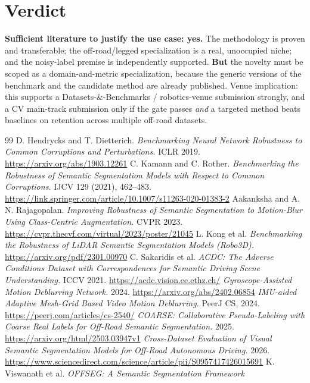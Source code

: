 \documentclass[11pt]{article}
\begin{document}
\section{Verdict}
\textbf{Sufficient literature to justify the use case: yes.} The methodology is
proven and transferable; the off-road/legged specialization is a real, unoccupied
niche; and the noisy-label premise is independently supported. \textbf{But} the
novelty must be scoped as a domain-and-metric specialization, because the generic
versions of the benchmark and the candidate method are already published. Venue
implication: this supports a Datasets-\&-Benchmarks / robotics-venue submission
strongly, and a CV main-track submission only if the gate passes \emph{and} a
targeted method beats baselines on retention across multiple off-road datasets.

\begin{thebibliography}{99}
 D. Hendrycks and T. Dietterich.
  \emph{Benchmarking Neural Network Robustness to Common Corruptions and Perturbations.}
  ICLR 2019. \url{https://arxiv.org/abs/1903.12261}
 C. Kamann and C. Rother.
  \emph{Benchmarking the Robustness of Semantic Segmentation Models with Respect to
  Common Corruptions.} IJCV 129 (2021), 462--483.
  \url{https://link.springer.com/article/10.1007/s11263-020-01383-2}
 Aakanksha and A. N. Rajagopalan.
  \emph{Improving Robustness of Semantic Segmentation to
  Motion-Blur Using Class-Centric Augmentation.} CVPR 2023.
  \url{https://cvpr.thecvf.com/virtual/2023/poster/21045}
 L. Kong et al. \emph{Benchmarking the Robustness of LiDAR Semantic
  Segmentation Models (Robo3D).} \url{https://arxiv.org/pdf/2301.00970}
 C. Sakaridis et al. \emph{ACDC: The Adverse Conditions Dataset with
  Correspondences for Semantic Driving Scene Understanding.} ICCV 2021.
  \url{https://acdc.vision.ee.ethz.ch/}
 \emph{Gyroscope-Assisted Motion Deblurring Network.} 2024.
  \url{https://arxiv.org/abs/2402.06854}
 \emph{IMU-aided Adaptive Mesh-Grid Based Video Motion Deblurring.}
  PeerJ CS, 2024. \url{https://peerj.com/articles/cs-2540/}
 \emph{COARSE: Collaborative Pseudo-Labeling with Coarse Real Labels
  for Off-Road Semantic Segmentation.} 2025. \url{https://arxiv.org/html/2503.03947v1}
 \emph{Cross-Dataset Evaluation of Visual Semantic Segmentation
  Models for Off-Road Autonomous Driving.} 2026.
  \url{https://www.sciencedirect.com/science/article/pii/S0957417426015691}
 K. Viswanath et al. \emph{OFFSEG: A Semantic Segmentation Framework
}
\end{thebibliography}
\end{document}

